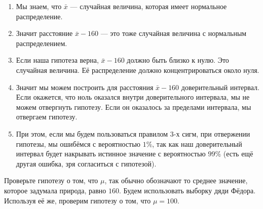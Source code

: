 \documentclass[12pt, a4paper, oneside]{article}
\begin{document}
\begin{enumerate} 
	\renewcommand{\labelenumi}{\arabic{enumi})}
	\item  Мы знаем, что $\bar x $ --- случайная величина, которая имеет нормальное распределение.
	
	\item Значит расстояние  $\bar x - 160$ --- это тоже случайная величина с нормальным распределением.
	
	\item Если наша гипотеза верна, $\bar x - 160$ должно быть близко к нулю. Это случайная величина. Её распределение должно концентрироваться около нуля. 
	
	\item Значит мы можем построить для расстояния $\bar x - 160$ доверительный интервал. Если окажется,  что ноль оказался внутри доверительного интервала, мы не можем отвергнуть гипотезу. Если он оказалось за пределами интервала, мы отвергаем гипотезу. 
	
	\item При этом, если мы будем пользоваться правилом $3$-х сигм, при отвержении гипотезы, мы ошибёмся с вероятностью $1\%$, так как наш доверительный интервал будет накрывать истинное значение с вероятностью $99\%$ (есть ещё другая ошибка,  зря согласиться с гипотезой). 
\end{enumerate}

Проверьте гипотезу о том, что $\mu$, так обычно обозначают то среднее значение, которое задумала природа, равно $160$. Будем использовать выборку дяди Фёдора. Используя её же, проверим гипотезу о том, что  $\mu = 100$.
\end{document}
